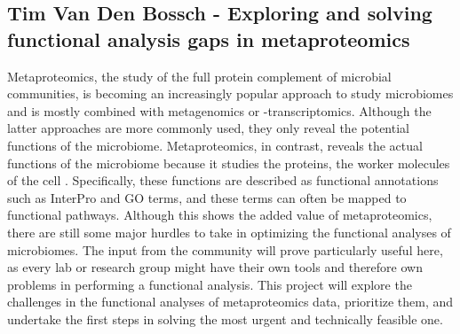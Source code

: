 \subsection{Tim Van Den Bossch - Exploring and solving functional analysis gaps in metaproteomics}

Metaproteomics, the study of the full protein complement of microbial communities, is becoming an increasingly popular approach to study microbiomes and is mostly combined with metagenomics or -transcriptomics. Although the latter approaches are more commonly used, they only reveal the potential functions of the microbiome. Metaproteomics, in contrast, reveals the actual functions of the microbiome because it studies the proteins, the worker molecules of the cell \citep{pmid32174200}. Specifically, these functions are described as functional annotations such as InterPro and GO terms, and these terms can often be mapped to functional pathways. Although this shows the added value of metaproteomics, there are still some major hurdles to take in optimizing the functional analyses of microbiomes. The input from the community will prove particularly useful here, as every lab or research group might have their own tools and therefore own problems in performing a functional analysis. This project will explore the challenges in the functional analyses of metaproteomics data, prioritize them, and undertake the first steps in solving the most urgent and technically feasible one. 

